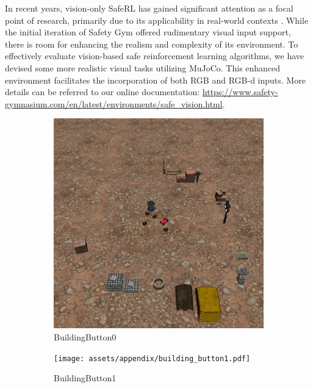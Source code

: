 \documentclass{article}
\begin{document}
In recent years, vision-only SafeRL has gained significant attention as a focal point of research, primarily due to its applicability in real-world contexts \cite{ma2022conservative, as2022constrained}. While the initial iteration of Safety Gym offered rudimentary visual input support, there is room for enhancing the realism and complexity of its environment. To effectively evaluate vision-based safe reinforcement learning algorithms, we have devised some more realistic visual tasks utilizing MuJoCo. This enhanced environment facilitates the incorporation of both RGB and RGB-d inputs. More details can be referred to our online documentation: \url{https://www.safety-gymnasium.com/en/latest/environments/safe_vision.html}.
\begin{figure}[H]
    \centering
      \begin{subfigure}{0.3\linewidth}
        \centering
        \includegraphics[width=\linewidth]{assets/appendix/building_button0.pdf}
        \caption{BuildingButton0}
      \end{subfigure}
      \begin{subfigure}{0.3\linewidth}
        \centering
        \texttt{[image: assets/appendix/building\_button1.pdf]}
        \caption{BuildingButton1}
      \end{subfigure}
      \begin{subfigure}{0.3\linewidth}

\end{subfigure}
\end{figure}
\end{document}

